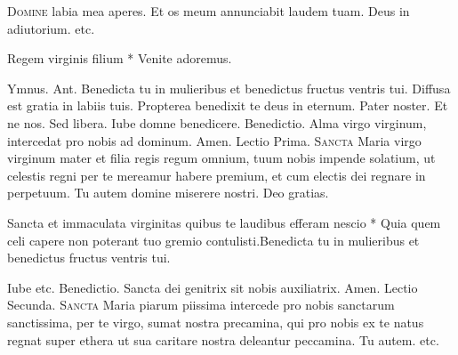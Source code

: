 \begin{multicols*}{2}
{\color{Red} }
\lettrine[lines=2]{\zallmancaps \color{Red} D}{omine} labia mea aperes. Et os meum annunciabit laudem tuam. Deus in adiutorium. etc.
\begin{invitatory-full}
{Regem virginis filium * Venite adoremus.}
\end{invitatory-full}
{\color{Red} Ymnus.}
{\color{Red} Ant.} Benedicta tu in mulieribus et benedictus fructus ventris tui.
\V Diffusa est gratia in labiis tuis. \R Propterea benedixit te deus in eternum. Pater noster. Et ne nos. Sed libera. Iube domne benedicere. {\color{Red} Benedictio.} Alma virgo virginum, intercedat pro nobis ad dominum. Amen. {\color{Red} Lectio Prima.}
\lettrine[lines=2]{\zallmancaps \color{Blue} S}{ancta} Maria virgo virginum mater et filia regis regum omnium, tuum nobis impende solatium, ut celestis regni per te mereamur habere premium, et cum electis dei regnare in perpetuum. Tu autem domine miserere nostri. Deo gratias.
\begin{responsory}
{Sancta et immaculata virginitas quibus te laudibus efferam nescio * Quia quem celi capere non poterant tuo gremio contulisti.}{Benedicta tu in mulieribus et benedictus fructus ventris tui.}
\end{responsory}
Iube etc. {\color{Red} Benedictio.} Sancta dei genitrix sit nobis auxiliatrix. Amen. {\color{Red} Lectio Secunda.}
\lettrine[lines=2]{\zallmancaps \color{Red} S}{ancta} Maria piarum piissima intercede pro nobis sanctarum sanctissima, per te virgo, sumat nostra precamina, qui pro nobis ex te natus regnat super ethera ut sua caritare nostra deleantur peccamina. Tu autem. etc.

\end{multicols*}
